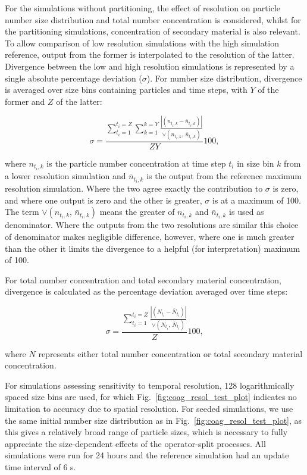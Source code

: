 \documentclass[gmd, manuscript]{copernicus}
\begin{document}
For the simulations without partitioning, the effect of resolution on particle number size distribution and total number concentration is considered, whilst for the partitioning simulations, concentration of secondary material is also relevant.  To allow comparison of low resolution simulations with the high simulation reference, output from the former is interpolated to the resolution of the latter.  Divergence between the low and high resolution simulations is represented by a single absolute percentage deviation ($\sigma$).  For number size distribution, divergence  is averaged over size bins containing particles and time steps, with $Y$ of the former and $Z$ of the latter:

\begin{equation} \label{eq:tr_diverg_nsd}
\sigma = \frac{\sum_{t_i=1}^{t_i=Z} \sum_{k=1}^{k=Y}\frac{|(n_{t_i,k}-\bar{n}_{t_i,k})|}{\lor(n_{t_i,k},\, \bar{n}_{t_i,k})}}{ZY}100,
\end{equation}

where $n_{t_i,k}$ is the particle number concentration at time step $t_i$ in size bin $k$ from a lower resolution simulation and $\bar{n}_{t_i,k}$ is the output from the reference maximum resolution simulation.  Where the two agree exactly the contribution to $\sigma$ is zero, and where one output is zero and the other is greater, $\sigma$ is at a maximum of 100.  The term $\lor(n_{t_i,k},\, \bar{n}_{t_i,k})$ means the greater of $n_{t_i,k}$ and $\bar{n}_{t_i,k}$ is used as denominator.  Where the outputs from the two resolutions are similar this choice of denominator makes negligible difference, however, where one is much greater than the other it limits the divergence to a helpful (for interpretation) maximum of 100.  

For total number concentration and total secondary material concentration, divergence is calculated as the percentage deviation averaged over time steps:

\begin{equation} \label{eq:tr_diverg}
\sigma = \frac{\sum_{t_i=1}^{t_i=Z} \frac{|(N_{t_i}-\bar{N}_{t_i})|}{\lor(N_{t_i},\, \bar{N}_{t_i})}}{Z}100,
\end{equation}

where $N$ represents either total number concentration or total secondary material concentration.

For simulations assessing sensitivity to temporal resolution, 128 logarithmically spaced size bins are used, for which Fig.~\ref{fig:coag_resol_test_plot} indicates no limitation to accuracy due to spatial resolution.  For seeded simulations, we use the same initial number size distribution as in Fig.~\ref{fig:coag_resol_test_plot}, as this gives a relatively broad range of particle sizes, which is necessary to fully appreciate the size-dependent effects of the operator-split processes.  All simulations were run for 24 hours and the reference simulation had an update time interval of 6 \unit{s}.
\end{document}
